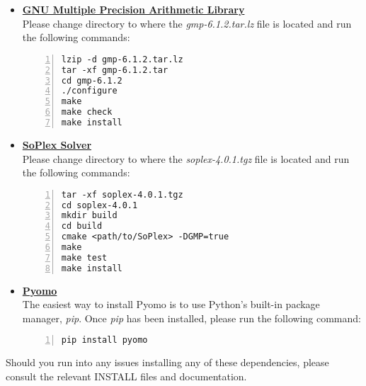 \documentclass[a4paper]{article}
\begin{document}
\begin{itemize}
\item \textbf{\href{https://gmplib.org/}{GNU Multiple Precision Arithmetic Library}} \\ Please change directory to where the \textit{gmp-6.1.2.tar.lz} file is located and run the following commands:
\begin{center}
\begin{minipage}{4cm}
\begin{Verbatim}[numbers=left, numberblanklines=false]
lzip -d gmp-6.1.2.tar.lz
tar -xf gmp-6.1.2.tar
cd gmp-6.1.2
./configure
make
make check
make install
\end{Verbatim}
\end{minipage}
\end{center}

\item \textbf{\href{https://soplex.zib.de/index.php\#download}{SoPlex Solver}} \\ Please change directory to where the \textit{soplex-4.0.1.tgz} file is located and run the following commands:
\begin{center}
\begin{minipage}{4cm}
\begin{Verbatim}[numbers=left, numberblanklines=false]
tar -xf soplex-4.0.1.tgz
cd soplex-4.0.1
mkdir build
cd build
cmake <path/to/SoPlex> -DGMP=true
make
make test
make install
\end{Verbatim}
\end{minipage}
\end{center}

\item \textbf{\href{http://www.pyomo.org/installation}{Pyomo}} \\ The easiest way to install Pyomo is to use Python's built-in package manager, \textit{pip}. Once \textit{pip} has been installed, please run the following command:
\begin{center}
\begin{minipage}{4cm}
\begin{Verbatim}[numbers=left, numberblanklines=false]
pip install pyomo
\end{Verbatim}
\end{minipage}
\end{center}
\end{itemize}

Should you run into any issues installing any of these dependencies, please consult the relevant INSTALL files and documentation.
\end{document}
